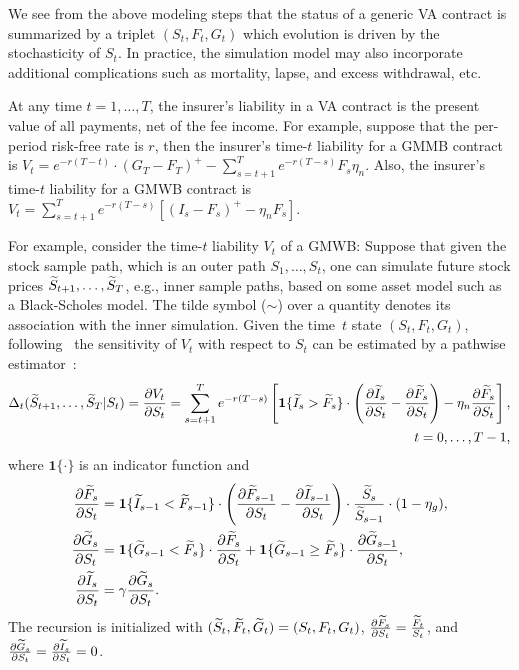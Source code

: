 We see from the above modeling steps that the status of a generic VA contract is summarized by a triplet $(S_t,F_t,G_t)$ which evolution is driven by the stochasticity of $S_t$.
In practice, the simulation model may also incorporate additional complications such as mortality, lapse, and excess withdrawal, etc.

At any time $t=1,\ldots,T$, the insurer's liability in a VA contract is the present value of all payments, net of the fee income.
For example, suppose that the per-period risk-free rate is $r$, then
the insurer's time-$t$ liability for a GMMB contract is $V_t = e^{-r(T-t)}\cdot (G_T - F_T)^+ - \sum_{s=t+1}^{T} e^{-r(T-s)} F_s \eta_n$.
Also, the insurer's time-$t$ liability for a GMWB contract is $V_t = \sum_{s=t+1}^{T} e^{-r(T-s)} [(I_s - F_s)^+- \eta_n F_s] $.

For example, consider the time-$t$ liability $V_t$ of a GMWB:
Suppose that given the stock sample path, which is an outer path $S_1,\ldots,S_t$, one can simulate future stock prices $\widetilde{S}_{t+1},\ldots,\widetilde{S}_{T}$, e.g., inner sample paths, based on some asset model such as a Black-Scholes model.
The tilde symbol ($\sim$) over a quantity denotes its association with the inner simulation.
Given the time~$t$ state $(S_t,F_t,G_t)$, following~\cite{cathcart2015calculating} the sensitivity of $V_t$ with respect to $S_t$ can be estimated by a pathwise estimator~\citep{glasserman2004monte}:
\begin{align}\label{eq2:delta}
    \Delta_t(\widetilde{S}_{t+1},\ldots,\widetilde{S}_{T} | S_t) = \frac{\partial V_t}{\partial S_t} = \sum_{s=t+1}^{T} e^{-r(T-s)} \left[\bm{1}\{\widetilde{I}_s > \widetilde{F}_s\} \cdot \left( \frac{\partial \widetilde{I}_s}{ \partial S_t} - \frac{\partial \widetilde{F}_s}{ \partial S_t}\right)- \eta_n \frac{\partial \widetilde{F}_s}{ \partial S_t}\right], \nonumber \\
    t=0,\ldots,T-1,
\end{align}
where $\bm{1}\{\cdot\}$ is an indicator function and
\begin{align*}
    \frac{\partial \widetilde{F}_s}{ \partial S_t} &= \bm{1}\{\widetilde{I}_{s-1} < \widetilde{F}_{s-1}\}\cdot\left( \frac{\partial \widetilde{F}_{s-1}}{ \partial S_t} - \frac{\partial \widetilde{I}_{s-1}}{ \partial S_t}\right) \cdot \frac{\widetilde{S}_s}{\widetilde{S}_{s-1}}\cdot (1-\eta_g),\\
    \frac{\partial \widetilde{G}_s}{ \partial S_t} &= \bm{1}\{\widetilde{G}_{s-1} < \widetilde{F}_{s}\}\cdot\frac{\partial \widetilde{F}_{s}}{ \partial S_t} + \bm{1}\{\widetilde{G}_{s-1} \geq \widetilde{F}_{s}\}\cdot\frac{\partial \widetilde{G}_{s-1}}{ \partial S_t},\\
    \frac{\partial \widetilde{I}_s}{ \partial S_t} &= \gamma \frac{\partial \widetilde{G}_s}{ \partial S_t}.
\end{align*}
The recursion is initialized with $(\widetilde{S}_t,\widetilde{F}_t,\widetilde{G}_t) = (S_t,F_t,G_t)$, $\frac{\partial \widetilde{F}_s}{ \partial S_t} = \frac{\widetilde{F}_t}{S_t}$, and $\frac{\partial \widetilde{G}_s}{ \partial S_t} = \frac{\partial \widetilde{I}_s}{ \partial S_t} = 0$.


